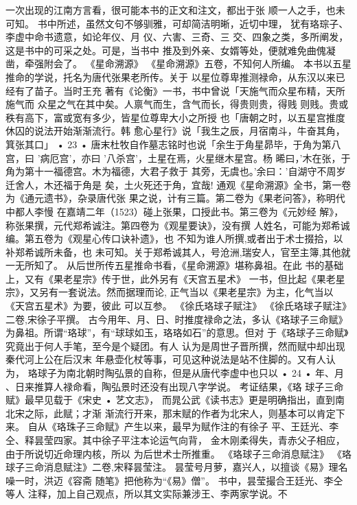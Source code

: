 一次出现的江南方言看，很可能本书的正文和注文，都出于张
顺一人之手，也未可知。
书中所述，虽然文句不够驯雅，可却简洁明晰，近切中理，
犹有珞琮子、李虚中命书遗意，如论年仪、月 仪、六害、三奇、三
交、四象之类，多所阐发，这是书中的可采之处。可是，当书中
推及到外亲、女婿等处，便就难免曲傀凝凿，牵强附会了。
《星命溯源》
《星命溯源》五卷，不知何人所编。
本书以五星推命的学说，托名为唐代张果老所传。关于
以星位尊卑推测禄命，从东汉以来已经有了苗子。当时王充
著有《论衡》一书，书中曾说「天施气而众星布精，天所施气而
众星之气在其中矣。人禀气而生，含气而长，得贵则贵，得贱
则贱。贵或秩有高下，富或宽有多少，皆星位尊卑大小之所授
也「唐朝之时，以五星宫推度休囚的说法开始渐渐流行。韩
愈心星行》说「我生之辰，月宿南斗，牛奋其角，箕张其口」
• 23 •
唐末杜牧自作墓志铭时也说「余生于角星昴毕，于角为第八
宫，曰 '病厄宫'，亦曰 '八杀宫'，土星在焉，火星继木星宫。杨
晞曰，'木在张，于角为第十一福德宫。木为福德，大君子救于
其旁，无虞也。'余曰：'自湖守不周岁迁舍人，木还福于角是
矣，土火死还于角，宜哉!
通观《星命溯源》全书，第一卷为《通元遗书》，杂录唐代张
果之说，计有三篇。第二卷为《果老问答》，称明代中都人李慢
在嘉靖二年（1523）碰上张果，口授此书。第三卷为《元妙经
解》，称张果撰，元代郑希诚注。第四卷为《观星要诀》，没有撰
人姓名，可能为郑希诚编。第五卷为《观星心传口诀补遗》，也
不知为谁人所撰,或者出于术士掇拾，以补郑希诚所未备，也
未可知。关于郑希诚其人，号沧洲,瑞安人，官至主簿,其他就
一无所知了。
从后世所传五星推命书看，《星命溯源》堪称鼻祖。在此
书的基础上，又有《果老星宗》传于世，此外另有《天宫五星术》
一书，但比起《果老星宗》，又另有一套说法。然而据理而论,
正气当以《果老星宗》为主，化气当以《天宫五星术》为要，彼此
可以互参。
《徐氏珞球子赋注》
《徐氏珞球子赋注》二卷,宋徐子平撰。
古今用年、月、日、时推度禄命之法，多认《珞球子三命赋》
为鼻祖。所谓“珞球”，有“球球如玉，珞珞如石”的意思。但对
于《珞球子三命赋》究竟出于何人手笔，至今是个疑团。有人
认为是周世子晋所撰，然而赋中却出现秦代河上公在后汉末
年悬壶化杖等事，可见这种说法是站不住脚的。又有人认为，
珞球子为南北朝时陶弘景的自称，但是从唐代李虚中也只以
• 24 •
年、月 、日来推算人禄命看，陶弘景时还没有出现八字学说。
考证结果，《珞 球子三命赋》最早见载于《宋史 • 艺文志》，
而晁公武《读书志》更是明确指出，直到南北宋之际，此赋；才渐
渐流行开来，那末赋的作者为北宋人，则基本可以肯定下来。
自从《珞珠子三命赋》产生以来，最早为赋作注的有徐子
平、王廷光、李仝、释昙莹四家。其中徐子平注本论运气向背，
金木刚柔得失，青赤父子相应，由于所说切近命理内核，所以
为后世术士所推重。
《珞球子三命消息赋注》
《珞球子三命消息赋注》二卷,宋释昙莹注。
昙莹号月萝，嘉兴人，以擅谈《易》理名噪一时，洪迈《容斋
随笔》把他称为“《易》僧”。 书中，昙莹撮合王廷光、李仝等人
注释，加上自己观点，所以其文实际兼涉王、李两家学说。不
